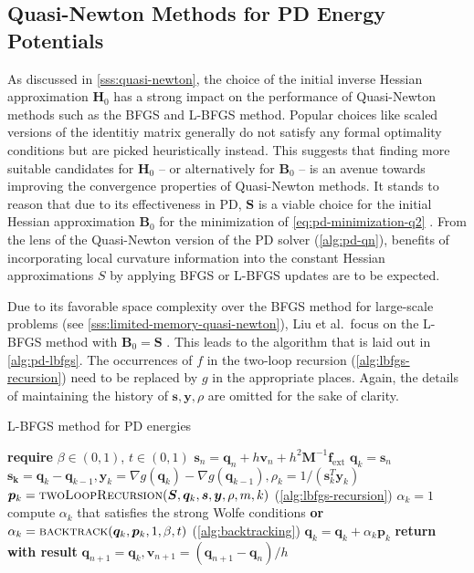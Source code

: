 \subsection{Quasi-Newton Methods for PD Energy Potentials}\label{ss:qn-pd}
As discussed in \cref{sss:quasi-newton}, 
the choice of the initial inverse Hessian approximation $\bm{H}_0$ has a strong impact on the performance of Quasi-Newton
methods such as the BFGS and L-BFGS method. Popular choices like scaled versions of the identitiy matrix generally do not
satisfy any formal optimality conditions but are picked heuristically instead. This suggests that finding more suitable 
candidates for $\bm{H}_0$ -- or alternatively for $\bm{B}_0$ -- is an avenue towards improving the convergence properties of 
Quasi-Newton methods. It stands to reason that due to its effectiveness in PD, $\bm{S}$ is a viable choice for the 
initial Hessian approximation $\bm{B}_0$ for the minimization of \cref{eq:pd-minimization-q2} \cite{liu2017}. From the lens
of the Quasi-Newton version of the PD solver (\cref{alg:pd-qn}), benefits of incorporating local curvature information into
the constant Hessian approximations $S$ by applying BFGS or L-BFGS updates are to be expected.

Due to its favorable space complexity over the BFGS method for large-scale problems (see \cref{sss:limited-memory-quasi-newton}), 
Liu et al.\ focus on the L-BFGS method with $\bm{B}_0 = \bm{S}$ \cite{liu2017}. This leads to the algorithm that is laid out in
\cref{alg:pd-lbfgs}. The occurrences of $f$ in the two-loop recursion (\cref{alg:lbfgs-recursion}) need to be replaced by $g$ 
in the appropriate places. Again, the details of maintaining the history of $\bm{s}, \bm{y}, \rho$ are omitted for the sake of clarity.

\begin{algorithm}
\caption{L-BFGS method for PD energies}\label{alg:pd-lbfgs}
\begin{algorithmic}[1]
\State \textbf{require } $\beta \in (0, 1)$, $t \in (0, 1)$
\State $\bm{s}_n = \bm{q}_n + h\bm{v}_n + h^2\bm{M}^{-1}\bm{f}_{\text{ext}}$
\State $\bm{q}_k = \bm{s}_n$
\State $\bm{s_k} = \bm{q}_k - \bm{q}_{k-1}, \bm{y}_k = \nabla g(\bm{q}_k) - \nabla g(\bm{q}_{k-1}), \rho_k = 1 / (\bm{s}^T_k \bm{y}_k)$
\State $\bm{p}_k = \text{\textsc{twoLoopRecursion}}(\bm{S}, \bm{q}_k, \bm{s}, \bm{y}, \rho, m, k)$   (\cref{alg:lbfgs-recursion})
\State $\alpha_k = 1$
\State compute $\alpha_k$ that satisfies the strong Wolfe conditions 
\State \textbf{or} $\alpha_k = \text{\textsc{backtrack}}(\bm{q}_k, \bm{p}_k, 1, \beta, t)$ (\cref{alg:backtracking})
\EndIf
\State $\bm{q}_k = \bm{q}_k + \alpha_k \bm{p}_k$
\EndFor
\State \textbf{return with result } $\bm{q}_{n+1} = \bm{q}_k, \bm{v}_{n+1} = (\bm{q}_{n+1} - \bm{q}_n)/h$
\EndProcedure
\end{algorithmic}
\end{algorithm}


